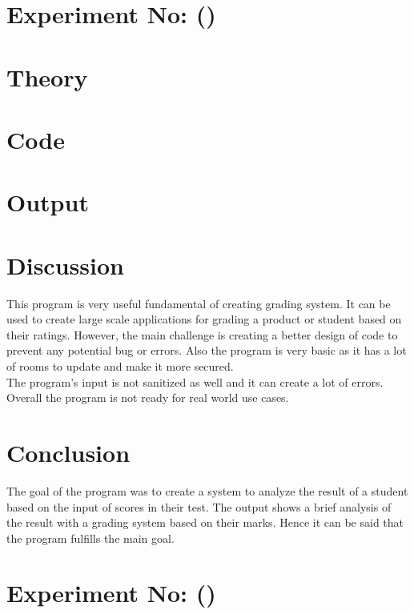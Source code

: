 \documentclass{report}
\newcounter{exp_no}
\begin{document}
\setcounter{chapter}{1}
\section*{Experiment No:  \thechapter ()}



\section*{Theory}

\section*{Code}

\section*{Output}
\begin{tcolorbox}[colback=black, coltext=white, fontupper=\ttfamily\small,sharp corners ]
    
\end{tcolorbox}
\section*{Discussion}
This program is very useful fundamental of creating grading system. It can be used to create large scale applications for grading a product or student based on their ratings. However, the main challenge is creating a better design of code to prevent any potential bug or errors. Also the program is very basic as it has a lot of rooms to update and make it more secured.\\
The program's input is not sanitized as well and it can create a lot of errors. Overall the program is not ready for real world use cases.

\section*{Conclusion}
The goal of the program was to create a system to analyze the result of a student based on the input of scores in their test.  The output shows a brief analysis of the result with a grading system based on their marks. Hence it can be said that the program fulfills the main goal.


\section*{Experiment No:  \thechapter ()}
\end{document}
